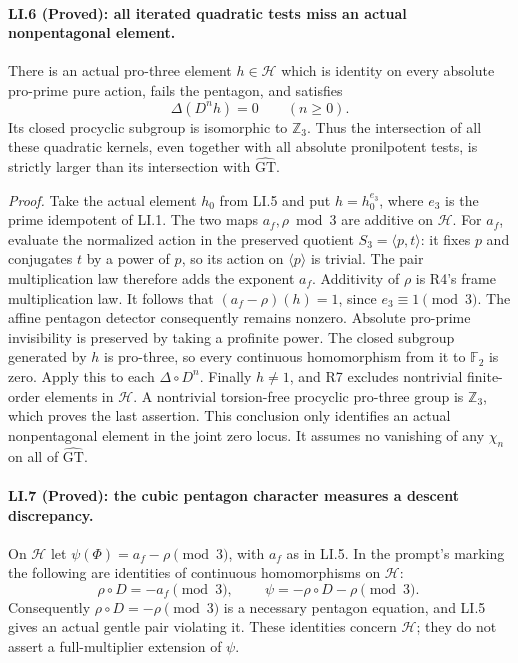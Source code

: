 \paragraph{LI.6 (Proved): all iterated quadratic tests miss an actual nonpentagonal element.}
There is an actual pro-three element $h\in\mathcal H$ which is
identity on every absolute pro-prime pure action, fails the pentagon,
and satisfies
\[
                   \Delta(D^n h)=0\qquad(n\geq0).
\]
Its closed procyclic subgroup is isomorphic to $\mathbb Z_3$.
Thus the intersection of all these quadratic kernels, even together
with all absolute pronilpotent tests, is strictly larger than its
intersection with $\widehat{\mathrm{GT}}$.

\emph{Proof.}
Take the actual element $h_0$ from LI.5 and put
$h=h_0^{e_3}$, where $e_3$ is the prime idempotent of LI.1.
The two maps $a_f,\rho\bmod3$ are additive on $\mathcal H$.
For $a_f$, evaluate the normalized action in the preserved quotient
$S_3=\langle p,t\rangle$: it fixes $p$ and conjugates $t$
by a power of $p$, so its action on $\langle p\rangle$ is trivial.
The pair multiplication law therefore adds the exponent $a_f$.
Additivity of $\rho$ is R4's frame multiplication law.
It follows that $(a_f-\rho)(h)=1$, since $e_3\equiv1\pmod3$.
The affine pentagon detector consequently remains nonzero.
Absolute pro-prime invisibility is preserved by taking a profinite
power. The closed subgroup generated by $h$ is pro-three, so every
continuous homomorphism from it to $\mathbb F_2$ is zero.
Apply this to each $\Delta\circ D^n$.
Finally $h\ne1$, and R7 excludes nontrivial finite-order elements
in $\mathcal H$. A nontrivial torsion-free procyclic pro-three
group is $\mathbb Z_3$, which proves the last assertion.
This conclusion only identifies an actual nonpentagonal element
in the joint zero locus. It assumes no vanishing of any
$\chi_n$ on all of $\widehat{\mathrm{GT}}$.

\paragraph{LI.7 (Proved): the cubic pentagon character measures a descent discrepancy.}
On $\mathcal H$ let $\psi(\Phi)=a_f-\rho\pmod3$, with
$a_f$ as in LI.5. In the prompt's marking the following are
identities of continuous homomorphisms on $\mathcal H$:
\[
 \rho\circ D=-a_f\pmod3,
 \qquad
 \boxed{\ \psi=-\rho\circ D-\rho\pmod3.\ }
\]
Consequently $\rho\circ D=-\rho\pmod3$ is a necessary
pentagon equation, and LI.5 gives an actual gentle pair violating
it. These identities concern $\mathcal H$; they do not assert
a full-multiplier extension of $\psi$.


